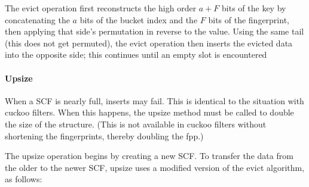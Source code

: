 \documentclass[letterpaper,twocolumn,10pt]{article}
\newcommand{\ints}{\mathbb{Z}}
\newcommand{\dotcup}{\ensuremath{\mathaccent\cdot\cup}}
\newcommand{\TCF}{SCF}
\newcommand{\TCF}{TCF}
\begin{document}
The evict operation first reconstructs the high order $a + F$ bits of the key by concatenating the $a$ bits of the bucket index and the $F$ bits of the fingerprint, then applying that side's permutation in reverse to the value. %
Using the same tail (this does not get permuted), the evict operation then inserts the evicted data into the opposite side;
this continues until an empty slot is encountered %





\paragraph{Upsize}
When a \TCF{} is nearly full, inserts may fail.
This is identical to the situation with cuckoo filters.
When this happens, the upsize method must be called to double the size of the structure. %
(This is not available in cuckoo filters without shortening the fingerprints, thereby doubling the fpp.)

The upsize operation begins by creating a new \TCF{}. %
To transfer the data from the older to the newer \TCF{}, upsize uses a modified version of the evict algorithm, as follows:
\end{document}
